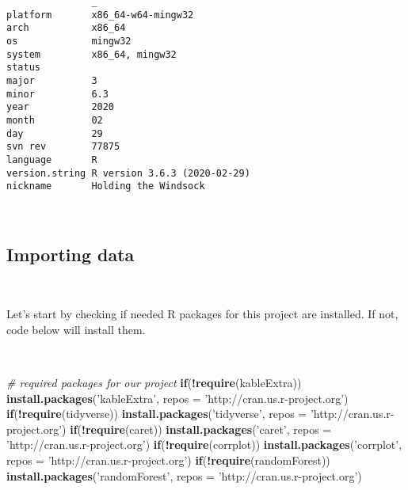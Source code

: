 \documentclass[
  10pt,
  a4paper]{article}
\newenvironment{Shaded}{\begin{snugshade}}{\end{snugshade}}
\newcommand{\CommentTok}[1]{\textcolor[rgb]{0.56,0.35,0.01}{\textit{#1}}}
\newcommand{\ControlFlowTok}[1]{\textcolor[rgb]{0.13,0.29,0.53}{\textbf{#1}}}
\newcommand{\DataTypeTok}[1]{\textcolor[rgb]{0.13,0.29,0.53}{#1}}
\newcommand{\KeywordTok}[1]{\textcolor[rgb]{0.13,0.29,0.53}{\textbf{#1}}}
\newcommand{\NormalTok}[1]{#1}
\newcommand{\OperatorTok}[1]{\textcolor[rgb]{0.81,0.36,0.00}{\textbf{#1}}}
\newcommand{\StringTok}[1]{\textcolor[rgb]{0.31,0.60,0.02}{#1}}
\begin{document}
\begin{verbatim}
               _                           
platform       x86_64-w64-mingw32          
arch           x86_64                      
os             mingw32                     
system         x86_64, mingw32             
status                                     
major          3                           
minor          6.3                         
year           2020                        
month          02                          
day            29                          
svn rev        77875                       
language       R                           
version.string R version 3.6.3 (2020-02-29)
nickname       Holding the Windsock        
\end{verbatim}

~

\hypertarget{importing-data}{%
\subsection{Importing data}\label{importing-data}}

~

Let's start by checking if needed R packages for this project are
installed. If not, code below will install them.

~

\begin{Shaded}
\begin{Highlighting}[]
\CommentTok{# required packages for our project}
\ControlFlowTok{if}\NormalTok{(}\OperatorTok{!}\KeywordTok{require}\NormalTok{(kableExtra)) }\KeywordTok{install.packages}\NormalTok{(}\StringTok{'kableExtra'}\NormalTok{, }
\DataTypeTok{repos =} \StringTok{'http://cran.us.r-project.org'}\NormalTok{)}
\ControlFlowTok{if}\NormalTok{(}\OperatorTok{!}\KeywordTok{require}\NormalTok{(tidyverse)) }\KeywordTok{install.packages}\NormalTok{(}\StringTok{'tidyverse'}\NormalTok{, }
\DataTypeTok{repos =} \StringTok{'http://cran.us.r-project.org'}\NormalTok{)}
\ControlFlowTok{if}\NormalTok{(}\OperatorTok{!}\KeywordTok{require}\NormalTok{(caret)) }\KeywordTok{install.packages}\NormalTok{(}\StringTok{'caret'}\NormalTok{, }
\DataTypeTok{repos =} \StringTok{'http://cran.us.r-project.org'}\NormalTok{)}
\ControlFlowTok{if}\NormalTok{(}\OperatorTok{!}\KeywordTok{require}\NormalTok{(corrplot)) }\KeywordTok{install.packages}\NormalTok{(}\StringTok{'corrplot'}\NormalTok{, }
\DataTypeTok{repos =} \StringTok{'http://cran.us.r-project.org'}\NormalTok{)}
\ControlFlowTok{if}\NormalTok{(}\OperatorTok{!}\KeywordTok{require}\NormalTok{(randomForest)) }\KeywordTok{install.packages}\NormalTok{(}\StringTok{'randomForest'}\NormalTok{, }
\DataTypeTok{repos =} \StringTok{'http://cran.us.r-project.org'}\NormalTok{)}
\end{Highlighting}
\end{Shaded}
\end{document}
